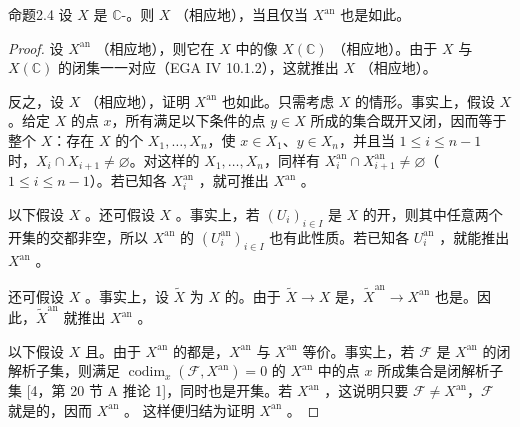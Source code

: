 \begin{SGAresult}{命题}{2.4}
设 $X$ 是 $\mathbb C$-。则 $X$ （相应地），当且仅当 $X^{\mathrm{an}}$ 也是如此。
\end{SGAresult}
\begin{proof}
设 $X^{\mathrm{an}}$ （相应地），则它在 $X$ 中的像 $X(\mathbb C)$ （相应地）。由于 $X$ 与 $X(\mathbb C)$ 的闭集一一对应（EGA IV 10.1.2），这就推出 $X$ （相应地）。

反之，设 $X$ （相应地），证明 $X^{\mathrm{an}}$ 也如此。只需考虑 $X$ 的情形。事实上，假设 $X$ 。给定 $X$ 的点 $x$，所有满足以下条件的点 $y\in X$ 所成的集合既开又闭，因而等于整个 $X$：存在 $X$ 的个 $X_1,\ldots,X_n$，使 $x\in X_1$、$y\in X_n$，并且当 $1\leq i\leq n-1$ 时，$X_i\cap X_{i+1}\ne\varnothing$。对这样的 $X_1,\ldots,X_n$，同样有 $X_i^{\mathrm{an}}\cap X_{i+1}^{\mathrm{an}}\ne\varnothing$（$1\leq i\leq n-1$）。若已知各 $X_i^{\mathrm{an}}$ ，就可推出 $X^{\mathrm{an}}$ 。

以下假设 $X$ 。还可假设 $X$ 。事实上，若 $(U_i)_{i\in I}$ 是 $X$ 的开，则其中任意两个开集的交都非空，所以 $X^{\mathrm{an}}$ 的 $(U_i^{\mathrm{an}})_{i\in I}$ 也有此性质。若已知各 $U_i^{\mathrm{an}}$ ，就能推出 $X^{\mathrm{an}}$ 。

还可假设 $X$ 。事实上，设 $\widetilde X$ 为 $X$ 的。由于 $\widetilde X\to X$ 是，$\widetilde X^{\mathrm{an}}\to X^{\mathrm{an}}$ 也是。因此，$\widetilde X^{\mathrm{an}}$ 就推出 $X^{\mathrm{an}}$ 。

以下假设 $X$ 且。由于 $X^{\mathrm{an}}$ 的都是，$X^{\mathrm{an}}$ 与 $X^{\mathrm{an}}$ 等价。事实上，若 $\mathcal F$ 是 $X^{\mathrm{an}}$ 的闭解析子集，则满足 $\operatorname{codim}_x(\mathcal F,X^{\mathrm{an}})=0$ 的 $X^{\mathrm{an}}$ 中的点 $x$ 所成集合是闭解析子集 [4，第 20 节 A 推论 1]，同时也是开集。若 $X^{\mathrm{an}}$ ，这说明只要 $\mathcal F\ne X^{\mathrm{an}}$，$\mathcal F$ 就是的，因而 $X^{\mathrm{an}}$ 。
这样便归结为证明 $X^{\mathrm{an}}$ 。


\end{proof}
